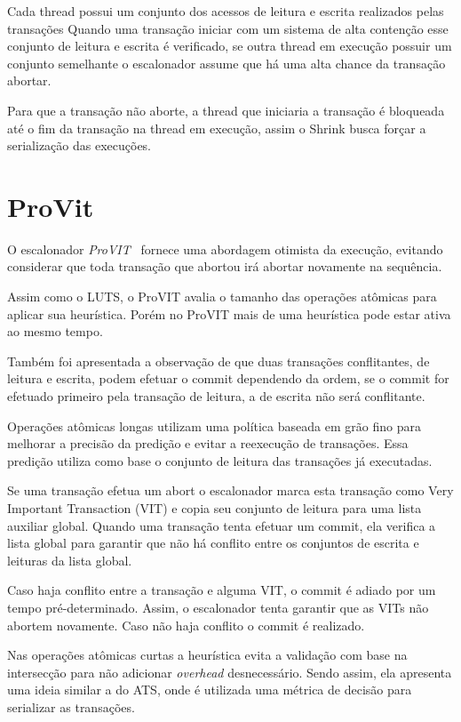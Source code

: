 \documentclass[diss,capa]{texufpel}
\begin{document}
Cada thread possui um conjunto dos acessos de leitura e escrita realizados pelas transações Quando uma transação iniciar com um sistema de alta contenção esse conjunto de leitura e escrita é verificado, se outra thread em execução possuir um conjunto semelhante o escalonador assume que há uma alta chance da transação abortar.

Para que a transação não aborte, a thread que iniciaria a transação é bloqueada até o fim da transação na thread em execução, assim o Shrink busca forçar a serialização das execuções.

\section{ProVit}

O escalonador \emph{ProVIT}~\cite{rito2015} fornece uma abordagem otimista da execução, evitando considerar que toda transação que abortou irá abortar novamente na sequência.

Assim como o LUTS, o ProVIT avalia o tamanho das operações atômicas para aplicar sua heurística. Porém no ProVIT mais de uma heurística pode estar ativa ao mesmo tempo.

Também foi apresentada a observação de que duas transações conflitantes, de leitura e escrita, podem efetuar o commit dependendo da ordem, se o commit for efetuado primeiro pela transação de leitura, a de escrita não será conflitante.

Operações atômicas longas utilizam uma política baseada em grão fino para melhorar a precisão da predição e evitar a reexecução de transações. Essa predição utiliza como base o conjunto de leitura das transações já executadas.

Se uma transação efetua um abort o escalonador marca esta transação como Very Important Transaction (VIT) e copia seu conjunto de leitura para uma lista auxiliar global.  Quando uma transação tenta efetuar um commit, ela verifica a lista global para garantir que não há conflito entre os conjuntos de escrita e leituras da lista global.

Caso haja conflito entre a transação e alguma VIT, o commit é adiado por um tempo pré-determinado. Assim, o escalonador tenta garantir que as VITs não abortem novamente. Caso não haja conflito o commit é realizado.

Nas operações atômicas curtas a heurística evita a validação com base na intersecção para não adicionar \emph{overhead} desnecessário. Sendo assim, ela apresenta uma ideia similar a do ATS, onde é utilizada uma métrica de decisão para serializar as transações.
\end{document}
